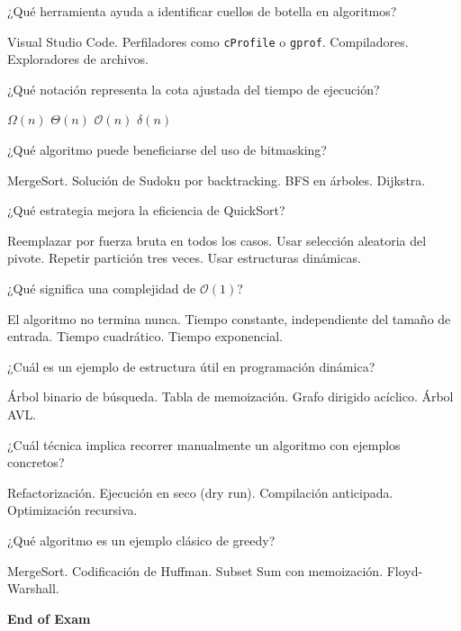 \documentclass[11pt, answers, addpoints]{exam}
\begin{document}
\begin{questions}
\question ¿Qué herramienta ayuda a identificar cuellos de botella en algoritmos?
\begin{choices}
\choice Visual Studio Code.
\CorrectChoice Perfiladores como \texttt{cProfile} o \texttt{gprof}.
\choice Compiladores.
\choice Exploradores de archivos.
\end{choices}

\question ¿Qué notación representa la cota ajustada del tiempo de ejecución?
\begin{choices}
\choice \(\Omega(n)\)
\CorrectChoice \(\Theta(n)\)
\choice \(\mathcal{O}(n)\)
\choice \(\delta(n)\)
\end{choices}

\question ¿Qué algoritmo puede beneficiarse del uso de bitmasking?
\begin{choices}
\choice MergeSort.
\CorrectChoice Solución de Sudoku por backtracking.
\choice BFS en árboles.
\choice Dijkstra.
\end{choices}

\question ¿Qué estrategia mejora la eficiencia de QuickSort?
\begin{choices}
\choice Reemplazar por fuerza bruta en todos los casos.
\CorrectChoice Usar selección aleatoria del pivote.
\choice Repetir partición tres veces.
\choice Usar estructuras dinámicas.
\end{choices}

\question ¿Qué significa una complejidad de \(\mathcal{O}(1)\)?
\begin{choices}
\choice El algoritmo no termina nunca.
\CorrectChoice Tiempo constante, independiente del tamaño de entrada.
\choice Tiempo cuadrático.
\choice Tiempo exponencial.
\end{choices}

\question ¿Cuál es un ejemplo de estructura útil en programación dinámica?
\begin{choices}
\choice Árbol binario de búsqueda.
\CorrectChoice Tabla de memoización.
\choice Grafo dirigido acíclico.
\choice Árbol AVL.
\end{choices}

\question ¿Cuál técnica implica recorrer manualmente un algoritmo con ejemplos concretos?
\begin{choices}
\choice Refactorización.
\CorrectChoice Ejecución en seco (dry run).
\choice Compilación anticipada.
\choice Optimización recursiva.
\end{choices}

\question ¿Qué algoritmo es un ejemplo clásico de greedy?
\begin{choices}
\choice MergeSort.
\CorrectChoice Codificación de Huffman.
\choice Subset Sum con memoización.
\choice Floyd-Warshall.
\end{choices}

\end{questions}


	\vspace{5mm}
	\noindent \textbf{End of Exam}
\end{document}
